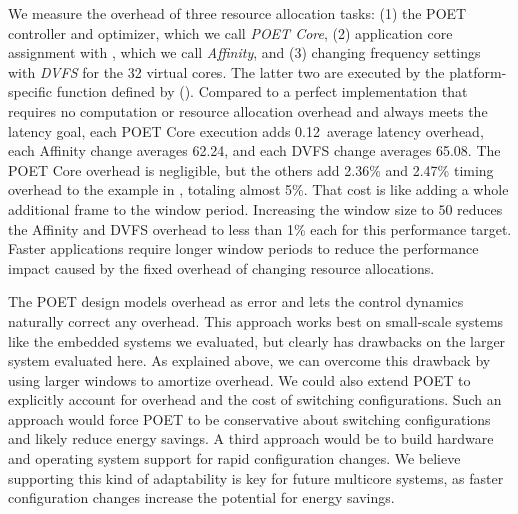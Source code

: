 We measure the overhead of three resource allocation tasks: (1) the POET controller and optimizer, which we call \textit{POET Core}, (2) application core assignment with , which we call \textit{Affinity}, and (3) changing frequency settings with \textit{DVFS} for the 32 virtual cores.
The latter two are executed by the platform-specific function defined by  ().
Compared to a perfect implementation that requires no computation or resource allocation overhead and always meets the latency goal, each POET Core execution adds 0.12\ms~average latency overhead, each Affinity change averages 62.24\ms, and each DVFS change averages 65.08\ms.
The POET Core overhead is negligible, but the others add 2.36\% and 2.47\% timing overhead to the example in , totaling almost 5\%.
That cost is like adding a whole additional frame to the window period.
Increasing the window size to $50$ reduces the Affinity and DVFS overhead to less than 1\% each for this  performance target.
Faster applications require longer window periods to reduce the performance impact caused by the fixed overhead of changing resource allocations.

The POET design models overhead as error and lets the control dynamics naturally correct any overhead.
This approach works best on small-scale systems like the embedded systems we evaluated, but clearly has drawbacks on the larger system evaluated here.
As explained above, we can overcome this drawback by using larger windows to amortize overhead.
We could also extend POET to explicitly account for overhead and the cost of switching configurations.
Such an approach would force POET to be conservative about switching configurations and likely reduce energy savings.
A third approach would be to build hardware and operating system support for rapid configuration changes.
We believe supporting this kind of adaptability is key for future multicore systems, as faster configuration changes increase the potential for energy savings.
